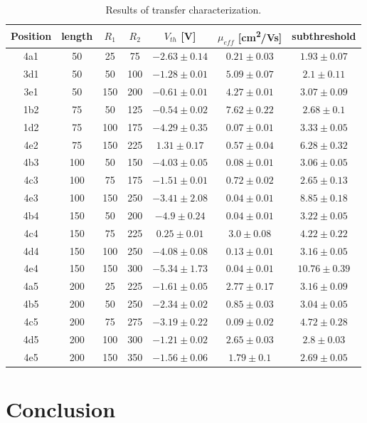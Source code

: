 \documentclass[%
 reprint,
amsmath,amssymb,
pra,
]{revtex4-1}
\begin{document}
\begin{table}
\centering
\begin{tabular}{|c|c|c|c|c|c|c|}
\hline 
Position & length & $R_1$ & $R_2$ & $V_{th}$ [\si{\volt}]  & $\mu_{eff}$  [\si{cm^2/Vs}] & subthreshold \\ 
\hline 
4a1 & 50 & 25 & 75 & $-2.63\pm 0.14$ & $0.21\pm 0.03$ & $1.93\pm 0.07$\\
\hline 
3d1 & 50 & 50 & 100 & $-1.28\pm 0.01$ & $5.09\pm 0.07$& $2.1\pm 0.11$\\
\hline 
3e1 & 50 & 150 & 200 & $-0.61\pm 0.01$ & $4.27\pm 0.01$& $3.07\pm 0.09$\\
\hline 
\hline 
1b2 & 75 & 50 & 125 & $-0.54\pm 0.02$ & $7.62\pm 0.22$& $2.68\pm 0.1$\\
\hline 
1d2 & 75 & 100 & 175 & $-4.29\pm 0.35$ & $0.07\pm 0.01$& $3.33\pm 0.05$\\
\hline 
4e2 & 75 & 150 & 225 & $1.31\pm 0.17$ & $0.57\pm 0.04$& $6.28\pm 0.32$\\
\hline 
\hline  
4b3 & 100 & 50 & 150 & $-4.03\pm 0.05$ & $0.08\pm 0.01$& $3.06\pm 0.05$\\
\hline 
4c3 & 100 & 75 & 175 & $-1.51\pm 0.01$ & $0.72\pm 0.02$& $2.65\pm 0.13$\\
\hline 
4e3 & 100 & 150 & 250 & $-3.41\pm 2.08$ & $0.04\pm 0.01$& $8.85\pm 0.18$\\
\hline
\hline 
4b4 & 150 & 50 & 200 & $-4.9\pm 0.24$ & $0.04\pm 0.01$& $3.22\pm 0.05$\\
\hline
4c4 & 150 & 75 & 225 & $0.25\pm 0.01$ & $3.0\pm 0.08$& $4.22\pm 0.22$\\
\hline 
4d4 & 150 & 100 & 250 & $-4.08\pm 0.08$ & $0.13\pm 0.01$& $3.16\pm 0.05$\\
\hline 
4e4 & 150 & 150 & 300 & $-5.34\pm 1.73$ & $0.04\pm 0.01$& $10.76\pm 0.39$\\
\hline 
\hline 
4a5 & 200 & 25 & 225 & $-1.61\pm 0.05$ & $2.77\pm 0.17$& $3.16\pm 0.09$\\
\hline 
4b5 & 200 & 50 & 250 & $-2.34\pm 0.02$ & $0.85\pm 0.03$& $3.04\pm 0.05$\\
\hline 
4c5 & 200 & 75 & 275 & $-3.19\pm 0.22$ & $0.09\pm 0.02$& $4.72\pm 0.28$\\
\hline
4d5 & 200 & 100 & 300 & $-1.21\pm 0.02$ & $2.65\pm 0.03$& $2.8\pm 0.03$\\
\hline 
4e5 & 200 & 150 & 350 & $-1.56\pm 0.06$ & $1.79\pm 0.1$& $2.69\pm 0.05$\\
\hline 
\end{tabular} 
\caption{Results of transfer characterization.}
\label{tab:transfer_results}
\end{table}

\section{Conclusion}

\end{document}
